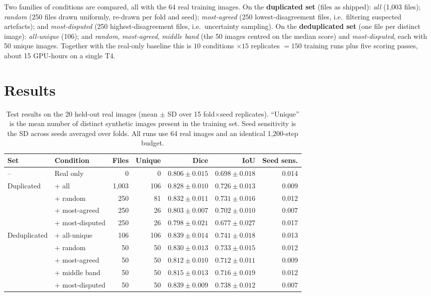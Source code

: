 \documentclass[11pt]{article}
\begin{document}
Two families of conditions are compared, all with the 64 real training images. On the \textbf{duplicated set} (files as shipped): \emph{all} (1{,}003 files); \emph{random} (250 files drawn uniformly, re-drawn per fold and seed); \emph{most-agreed} (250 lowest-disagreement files, i.e.\ filtering suspected artefacts); and \emph{most-disputed} (250 highest-disagreement files, i.e.\ uncertainty sampling). On the \textbf{deduplicated set} (one file per distinct image): \emph{all-unique} (106); and \emph{random}, \emph{most-agreed}, \emph{middle band} (the 50 images centred on the median score) and \emph{most-disputed}, each with 50 unique images. Together with the real-only baseline this is $10$ conditions $\times 15$ replicates $= 150$ training runs plus five scoring passes, about 15 GPU-hours on a single T4.

\section{Results}

\begin{table}[t]
\centering
\caption{Test results on the 20 held-out real images (mean $\pm$ SD over 15 fold$\times$seed replicates). ``Unique'' is the mean number of distinct synthetic images present in the training set. Seed sensitivity is the SD across seeds averaged over folds. All runs use 64 real images and an identical 1{,}200-step budget.}
\label{tab:main}
\footnotesize
\setlength{\tabcolsep}{4pt}
\begin{tabular}{llrrrrr}
\toprule
Set & Condition & Files & Unique & Dice & IoU & Seed sens. \\
\midrule
--           & Real only        & 0       & 0    & $0.806 \pm 0.015$ & $0.698 \pm 0.018$ & 0.014 \\
\midrule
Duplicated   & + all            & 1{,}003 & 106  & $0.828 \pm 0.010$ & $0.726 \pm 0.013$ & 0.009 \\
             & + random         & 250     & 81   & $0.832 \pm 0.011$ & $0.731 \pm 0.016$ & 0.012 \\
             & + most-agreed    & 250     & 26   & $0.803 \pm 0.007$ & $0.702 \pm 0.010$ & 0.007 \\
             & + most-disputed  & 250     & 26   & $0.798 \pm 0.021$ & $0.677 \pm 0.027$ & 0.017 \\
\midrule
Deduplicated & + all-unique     & 106     & 106  & $\mathbf{0.839 \pm 0.014}$ & $\mathbf{0.741 \pm 0.018}$ & 0.013 \\
             & + random         & 50      & 50   & $0.830 \pm 0.013$ & $0.733 \pm 0.015$ & 0.012 \\
             & + most-agreed    & 50      & 50   & $0.812 \pm 0.010$ & $0.712 \pm 0.011$ & 0.009 \\
             & + middle band    & 50      & 50   & $0.815 \pm 0.013$ & $0.716 \pm 0.019$ & 0.012 \\
             & + most-disputed  & 50      & 50   & $\mathbf{0.839 \pm 0.009}$ & $0.738 \pm 0.012$ & $\mathbf{0.007}$ \\
\bottomrule
\end{tabular}
\end{table}
\end{document}
